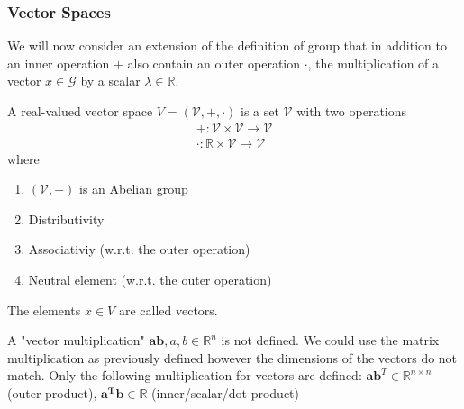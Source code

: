 \subsubsection{Vector Spaces}
We will now consider an extension of the definition of group that in addition to an inner operation $+$ also contain an outer operation $\cdot$, the multiplication of a vector $x\in \mathcal{G}$ by a scalar $\lambda \in \mathbb{R}$.
\begin{definition}
    A real-valued vector space $V = (\mathcal{V}, +, \cdot)$ is a set $\mathcal{V}$ with two operations
    \begin{align*}
        + : \mathcal{V} \times \mathcal{V} \rightarrow \mathcal{V}\\
        \cdot : \mathbb{R}  \times \mathcal{V} \rightarrow \mathcal{V}
    \end{align*}
    where
    \begin{enumerate}
        \item $(\mathcal{V},+)$ is an Abelian group
        \item Distributivity
        \item Associativiy (w.r.t. the outer operation)
        \item Neutral element (w.r.t. the outer operation)
    \end{enumerate}
\end{definition}
The elements $x \in V$ are called vectors.
\begin{remark}
    A "vector multiplication" $\mathbf{ab}, a,b \in \mathbb{R}^n$ is not defined. We could use the matrix multiplication as previously defined however the dimensions of the vectors do not match. Only the following multiplication for vectors are defined: $\mathbf{ab}^T \in \mathbb{R}^{n\times n}$ (outer product), $\mathbf{a^Tb}\in \mathbb{R}$ (inner/scalar/dot product)
\end{remark}

